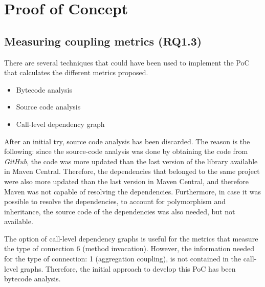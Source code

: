 \chapter{Proof of Concept}\label{ch:PoC}



\section{Measuring coupling metrics (RQ1.3)}
There are several techniques that could have been used to implement the PoC that calculates the different metrics proposed.

\begin{itemize}
  \item Bytecode analysis
  \item Source code analysis
  \item Call-level dependency graph
\end{itemize}

After an initial try, source code analysis has been discarded. The reason is the following: since the source-code analysis was done by obtaining the code from \textit{GitHub}, the code was more updated than the last version of the library available in Maven Central. Therefore, the dependencies that belonged to the same project were also more updated than the last version in Maven Central, and therefore Maven was not capable of resolving the dependencies. Furthermore, in case it was possible to resolve the dependencies, to account for polymorphism and inheritance, the source code of the dependencies was also needed, but not available.

The option of call-level dependency graphs is useful for the metrics that measure the type of connection 6 (method invocation). However, the information needed for the type of connection: 1 (aggregation coupling), is not contained in the call-level graphs. Therefore, the initial approach to develop this PoC has been bytecode analysis.


